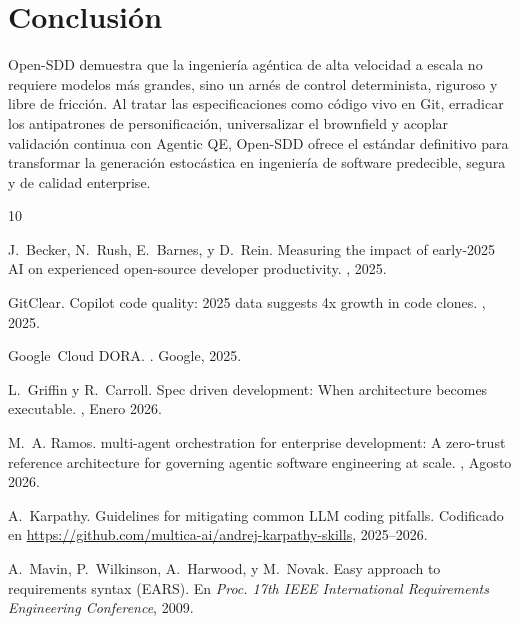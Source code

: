 \documentclass[11pt,a4paper]{article}
\begin{document}
\section{Conclusión}

Open-SDD demuestra que la ingeniería agéntica de alta velocidad a escala no requiere modelos más grandes, sino un arnés de control determinista, riguroso y libre de fricción. Al tratar las especificaciones como código vivo en Git, erradicar los antipatrones de personificación, universalizar el brownfield y acoplar validación continua con Agentic QE, Open-SDD ofrece el estándar definitivo para transformar la generación estocástica en ingeniería de software predecible, segura y de calidad enterprise.


\begin{thebibliography}{10}

J.~Becker, N.~Rush, E.~Barnes, y D.~Rein.
\newblock Measuring the impact of early-2025 {AI} on experienced open-source developer productivity.
, 2025.

GitClear.
 {C}opilot code quality: 2025 data suggests 4x growth in code clones.
, 2025.

Google~Cloud DORA.
.
\newblock Google, 2025.

L.~Griffin y R.~Carroll.
\newblock Spec driven development: When architecture becomes executable.
, Enero 2026.

M.~A. Ramos.
 multi-agent orchestration for enterprise development: A zero-trust reference architecture for governing agentic software engineering at scale.
, Agosto 2026.

A.~Karpathy.
\newblock Guidelines for mitigating common {LLM} coding pitfalls.
\newblock Codificado en \url{https://github.com/multica-ai/andrej-karpathy-skills}, 2025--2026.

A.~Mavin, P.~Wilkinson, A.~Harwood, y M.~Novak.
\newblock Easy approach to requirements syntax ({EARS}).
\newblock En {\em Proc. 17th IEEE International Requirements Engineering Conference}, 2009.


\end{thebibliography}
\end{document}
